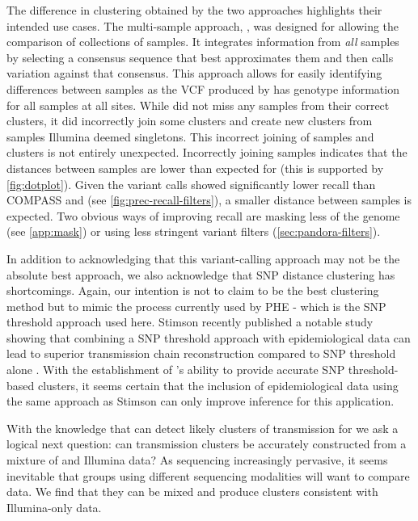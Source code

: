 The difference in clustering obtained by the two \pandora{} approaches highlights their intended use cases. The multi-sample approach, \compare{}, was designed for allowing the comparison of collections of samples. It integrates information from \emph{all} samples by selecting a consensus sequence that best approximates them and then calls variation against that consensus. This approach allows for easily identifying differences between samples as the VCF produced by \compare{} has genotype information for all samples at all sites. While \compare{} did not miss any samples from their correct clusters, it did incorrectly join some clusters and create new clusters from samples Illumina deemed singletons. This incorrect joining of samples and clusters is not entirely unexpected. Incorrectly joining samples indicates that the distances between samples are lower than expected for \compare{} (this is supported by \autoref{fig:dotplot}). Given the \pandora{} variant calls showed significantly lower recall than COMPASS and \bcftools{} (see \autoref{fig:prec-recall-filters}), a smaller distance between samples is expected. Two obvious ways of improving recall are masking less of the genome (see \autoref{app:mask}) or using less stringent variant filters (\autoref{sec:pandora-filters}). 

In addition to acknowledging that this variant-calling approach may not be the absolute best approach, we also acknowledge that SNP distance clustering has shortcomings. Again, our intention is not to claim to be the best clustering method but to mimic the process currently used by PHE - which is the SNP threshold approach used here. Stimson \etal{} recently published a notable study showing that combining a SNP threshold approach with epidemiological data can lead to superior transmission chain reconstruction compared to SNP threshold alone \cite{stimson2019}. With the establishment of \ont{}'s ability to provide accurate SNP threshold-based clusters, it seems certain that the inclusion of epidemiological data using the same approach as Stimson \etal{} can only improve inference for this application.

With the knowledge that \ont{} can detect likely clusters of transmission for \mtb{} we ask a logical next question: can transmission clusters be accurately constructed from a mixture of \ont{} and Illumina data? As \ont{} sequencing increasingly pervasive, it seems inevitable that groups using different sequencing modalities will want to compare data. We find that they can be mixed and produce clusters consistent with Illumina-only data. 

